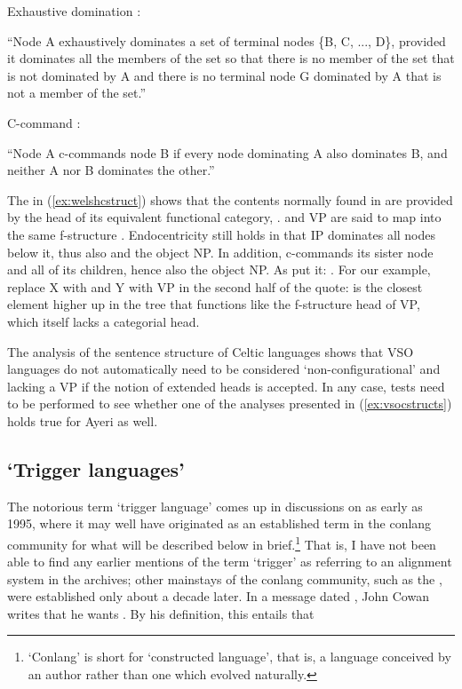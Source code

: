 \pex
\a Exhaustive domination \citep[121]{carnie2013}:\smallskip

	``Node A exhaustively dominates a set of terminal nodes \{B, C, ..., D\},
	provided it dominates all the members of the set so that there is no
	member of the set that is not dominated by A and there is no terminal node
	G dominated by A that is not a member of the set.''

\a C-command \citep[127]{carnie2013}:\smallskip

	``Node A c-commands node B if every node dominating A also dominates B, and
	neither A nor B dominates the other.''
\xe

The \Avm{} in (\ref{ex:welshcstruct}) shows that the contents normally found in
 are provided by the head of its equivalent functional category,
.  and VP are said to map into the same f-structure \citep
[136]{bresnan2016}. Endocentricity still holds in that IP dominates all nodes
below it, thus also  and the object NP. In addition, 
c-commands its sister node and all of its children, hence also the object NP.
As \citet{bresnan2016} put it: . For our example, replace X with
 and Y with VP in the second half of the quote:  is the
closest element higher up in the tree that functions like the f-structure head
of VP, which itself lacks a categorial head.

The analysis of the sentence structure of Celtic languages shows that VSO
languages do not automatically need to be considered `non-configurational' and
lacking a VP if the notion of extended heads is accepted. In any case, tests
need to be performed to see whether one of the analyses presented in
(\ref{ex:vsocstructs}) holds true for Ayeri as well.

\subsection[‘Trigger languages’]{`Trigger languages'}

The notorious term `trigger language' comes up in discussions on
 as early as 1995, where it may well have originated as an
established term in the conlang community for what will be described below in
brief.\footnote{`Conlang' is short for `constructed language', that is, a
language conceived by an author rather than one which evolved naturally.} That
is, I have not been able to find any earlier mentions of the term `trigger' as
referring to an alignment system in the archives; other mainstays of the
conlang community, such as the , were established only about a
decade later. In a message dated , John Cowan writes that
he wants . By his definition, this entails
that

